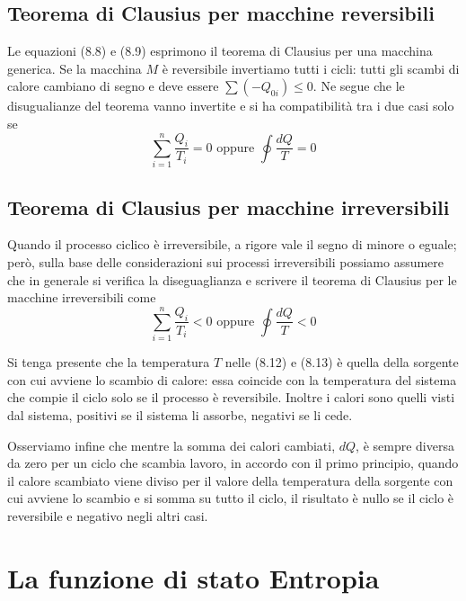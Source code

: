 \documentclass[class=book, crop=false, oneside, 12pt]{standalone}
\begin{document}
\subsection{Teorema di Clausius per macchine reversibili}

Le equazioni (8.8) e (8.9) esprimono il teorema di Clausius per una macchina generica.
Se la macchina \(M\) è reversibile invertiamo tutti i cicli: tutti gli scambi di calore cambiano di segno e deve essere \(\sum \left(-Q_{0i}\right) \leq 0\). 
Ne segue che le disugualianze del teorema vanno invertite e si ha compatibilità tra i due casi solo se 
\begin{equation}
    \sum_{i = 1}^{n} \frac{Q_i}{T_i} = 0 \text{ oppure } \oint \frac{d Q}{T} = 0
\end{equation}

\subsection{Teorema di Clausius per macchine irreversibili}

Quando il processo ciclico è irreversibile, a rigore vale il segno di minore o eguale; però, sulla base delle considerazioni sui processi irreversibili 
possiamo assumere che in generale si verifica la diseguaglianza e scrivere il teorema di Clausius per le macchine irreversibili come
\begin{equation}
    \sum_{i = 1}^{n} \frac{Q_i}{T_i} < 0 \text{ oppure } \oint \frac{d Q}{T} < 0
\end{equation} 

Si tenga presente che la temperatura \(T\) nelle (8.12) e (8.13) è quella della sorgente con cui avviene lo scambio di calore: essa coincide con la temperatura del sistema che compie il ciclo solo se il processo è reversibile. 
Inoltre i calori sono quelli visti dal sistema, positivi se il sistema li assorbe, negativi se li cede.

Osserviamo infine che mentre la somma dei calori cambiati, \(d Q\), è sempre diversa da zero per un ciclo che scambia lavoro, in accordo con il primo principio, quando il calore scambiato viene diviso per il valore della temperatura della sorgente con cui avviene lo scambio e si somma su tutto il ciclo, il risultato è nullo se il ciclo è reversibile e negativo negli altri casi. 

\section{La funzione di stato Entropia}
\end{document}
